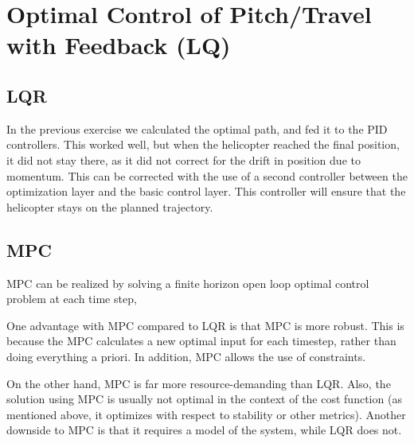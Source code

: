 
\section{Optimal Control of Pitch/Travel with Feedback (LQ)}
\subsection{LQR}
In the previous exercise we calculated the optimal path, and fed it to the PID controllers. This worked well, but when the helicopter reached the final position, it did not stay there, as it did not correct for the drift in position due to momentum. This can be corrected with the use of a second controller between the optimization layer and the basic control layer. This controller will ensure that the helicopter stays on the planned trajectory. 

\subsection{MPC}
MPC can be realized by solving a finite horizon open loop optimal control problem at each time step, 

One advantage with MPC compared to LQR is that MPC is more robust. This is because the MPC calculates a new optimal input for each timestep, rather than doing everything a priori. In addition, MPC allows the use of constraints.

\missingfigure{\label{fig:prob3_lambda}}

On the other hand, MPC is far more resource-demanding than LQR. Also, the solution using MPC is usually not optimal in the context of the cost function (as mentioned above, it optimizes with respect to stability or other metrics). Another downside to MPC is that it requires a model of the system, while LQR does not.
